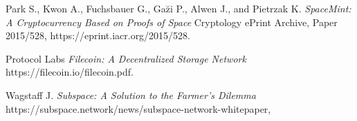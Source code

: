 \documentclass[conference]{IEEEtran}
\begin{document}
\begin{thebibliography}{9}
Park S., Kwon A., Fuchsbauer G., Ga\u{z}i P., Alwen J., and Pietrzak K.
\emph{SpaceMint: A Cryptocurrency Based on Proofs of Space}
Cryptology ePrint Archive, Paper 2015/528,
https://eprint.iacr.org/2015/528.

Protocol Labs
\emph{Filecoin: A Decentralized Storage Network}
https://filecoin.io/filecoin.pdf.

Wagstaff J.
\emph{Subspace: A Solution to the Farmer’s Dilemma}
https://subspace.network/news/subspace-network-whitepaper,




\end{thebibliography}
\end{document}
